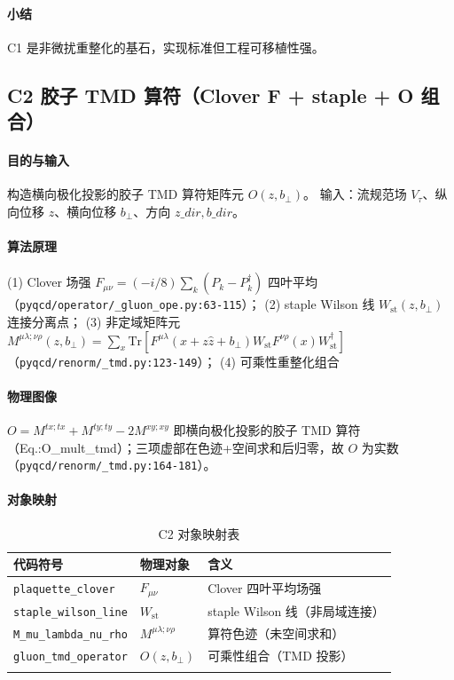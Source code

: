\documentclass[UTF8]{ctexart}
\begin{document}
\paragraph{小结} C1 是非微扰重整化的基石，实现标准但工程可移植性强。

\subsection{C2 胶子 TMD 算符（Clover F + staple + O 组合）}
\paragraph{目的与输入} 构造横向极化投影的胶子 TMD 算符矩阵元 $O(z,b_\perp)$。
输入：流规范场 $V_\tau$、纵向位移 $z$、横向位移 $b_\perp$、方向 $z\_dir,b\_dir$。
\paragraph{算法原理} (1) Clover 场强 $F_{\mu\nu}=(-i/8)\sum_k(P_k-P_k^\dagger)$ 四叶平均
（\textcolor{evidence}{\texttt{\nolinkurl{pyqcd/operator/_gluon_ope.py:63-115}}}）；
(2) staple Wilson 线 $W_{\mathrm{st}}(z,b_\perp)$ 连接分离点；
(3) 非定域矩阵元 $M^{\mu\lambda;\nu\rho}(z,b_\perp)=\sum_x\mathrm{Tr}[F^{\mu\lambda}(x+z\hat z+b_\perp)W_{\mathrm{st}} F^{\nu\rho}(x)W_{\mathrm{st}}^\dagger]$
（\textcolor{evidence}{\texttt{\nolinkurl{pyqcd/renorm/_tmd.py:123-149}}}）；
(4) 可乘性重整化组合

\paragraph{物理图像} $O=M^{tx;tx}+M^{ty;ty}-2M^{xy;xy}$ 即横向极化投影的胶子
TMD 算符（Eq.:O\_mult\_tmd）；三项虚部在色迹+空间求和后归零，故 $O$ 为实数
（\textcolor{evidence}{\texttt{\nolinkurl{pyqcd/renorm/_tmd.py:164-181}}}）。
\paragraph{对象映射}
\begin{xltabular}{\textwidth}{llX}
\toprule
\textcolor{relation}{代码符号} & 物理对象 & 含义 \\
\midrule
\endhead
\texttt{plaquette\_clover} & $F_{\mu\nu}$ & Clover 四叶平均场强 \\
\texttt{staple\_wilson\_line} & $W_{\mathrm{st}}$ & staple Wilson 线（非局域连接） \\
\texttt{M\_mu\_lambda\_nu\_rho} & $M^{\mu\lambda;\nu\rho}$ & 算符色迹（未空间求和） \\
\texttt{gluon\_tmd\_operator} & $O(z,b_\perp)$ & 可乘性组合（TMD 投影） \\
\bottomrule
\caption{C2 对象映射表}
\end{xltabular}
\end{document}
